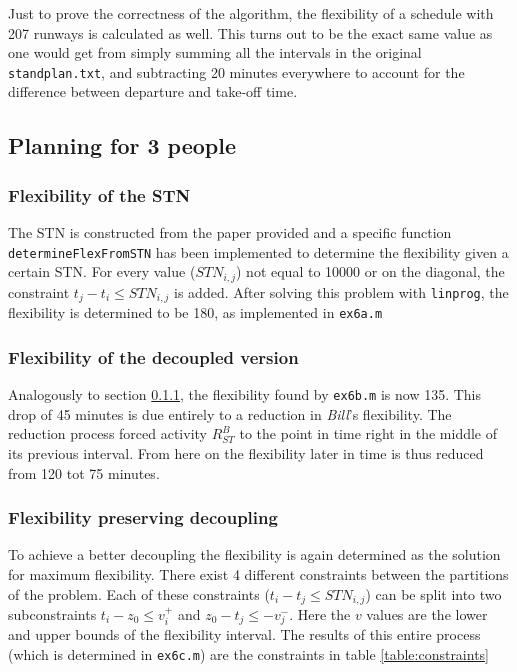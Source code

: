 \documentclass[10pt,a4paper]{article}
\begin{document}
Just to prove the correctness of the algorithm, the flexibility of a schedule with 207 runways is calculated as well. This turns out to be the exact same value as one would get from simply summing all the intervals in the original \texttt{standplan.txt}, and subtracting 20 minutes everywhere to account for the difference between departure and take-off time.

\subsection{Planning for 3 people}
\subsubsection{Flexibility of the STN}
\label{sec:flex_boerkoel_1}
The STN is constructed from the paper provided and a specific function \texttt{de\-ter\-mine\-Flex\-From\-STN} has been implemented to determine the flexibility given a certain STN. For every value ($STN_{i,j}$) not equal to 10000 or on the diagonal, the constraint $t_j - t_i \leq STN_{i,j}$ is added. After solving this problem with \texttt{linprog},  the flexibility is determined to be 180, as implemented in \texttt{ex6a.m}

\subsubsection{Flexibility of the decoupled version}
Analogously to section \ref{sec:flex_boerkoel_1}, the flexibility found by \texttt{ex6b.m} is now 135. This drop of 45 minutes is due entirely to a reduction in \emph{Bill}'s flexibility. The reduction process forced activity $R^{B}_{ST}$ to the point in time right in the middle of its previous interval. From here on the flexibility later in time is thus reduced from 120 tot 75 minutes.

\subsubsection{Flexibility preserving decoupling}
\label{sec:preserving_decoupling}
To achieve a better decoupling the flexibility is again determined as the solution for maximum flexibility. There exist 4 different constraints between the partitions of the problem. Each of these constraints ($t_i - t_j \leq STN_{i,j}$) can be split into two subconstraints $t_i - z_0 \leq v_i^+$ and $z_0 - t_j \leq -v_j^-$. Here the $v$ values are the lower and upper bounds of the flexibility interval. The results of this entire process (which is determined in \texttt{ex6c.m}) are the constraints in table \ref{table:constraints}
\end{document}
